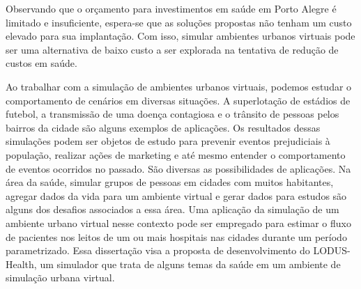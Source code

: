 Observando que o orçamento para investimentos em saúde em Porto Alegre é limitado e insuficiente, espera-se que as soluções propostas não tenham um custo elevado para sua implantação. Com isso, simular ambientes urbanos virtuais pode ser uma alternativa de baixo custo a ser explorada na tentativa de redução de custos em saúde.

Ao trabalhar com a simulação de ambientes urbanos virtuais, podemos estudar o comportamento de cenários em diversas situações. A superlotação de estádios de futebol, a transmissão de uma doença contagiosa e o trânsito de pessoas pelos bairros da cidade são alguns exemplos de aplicações. Os resultados dessas simulações podem ser objetos de estudo para prevenir eventos prejudiciais à população, realizar ações de marketing e até mesmo entender o comportamento de eventos ocorridos no passado. São diversas as possibilidades de aplicações. Na área da saúde, simular grupos de pessoas em cidades com muitos habitantes, agregar dados da vida para um ambiente virtual e gerar dados para estudos são alguns dos desafios associados a essa área. Uma aplicação da simulação de um ambiente urbano virtual nesse contexto pode ser empregado para estimar o fluxo de pacientes nos leitos de um ou mais hospitais nas cidades durante um período parametrizado. Essa dissertação visa a proposta de desenvolvimento do LODUS-Health, um simulador que trata de alguns temas da saúde em um ambiente de simulação urbana virtual.



